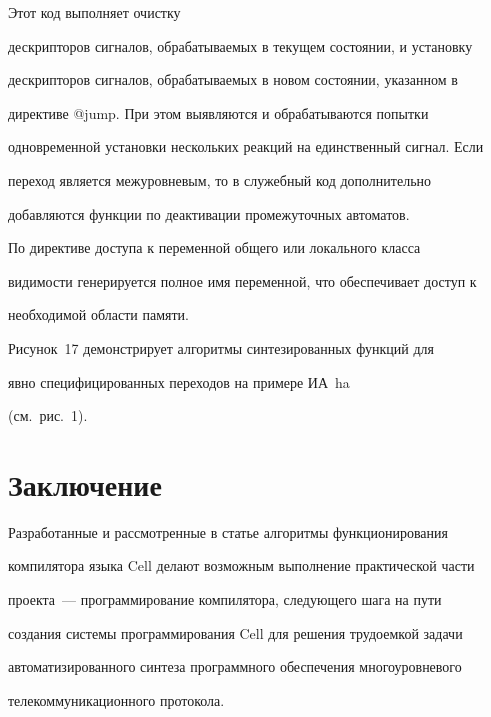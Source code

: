 Этот код выполняет очистку 


дескрипторов сигналов, обрабатываемых в текущем состоянии, и установку 


дескрипторов сигналов, обрабатываемых в новом состоянии, указанном в 


директиве @jump. При этом выявляются и обрабатываются попытки 


одновременной установки нескольких реакций на единственный сигнал. Если 


переход является межуровневым, то в служебный код дополнительно 


добавляются функции по деактивации промежуточных автоматов.


      


      По директиве доступа к переменной общего или локального класса 


видимости генерируется полное имя переменной, что обеспечивает доступ к 


необходимой области памяти.


      


      Рисунок~17 демонстрирует алгоритмы синтезированных функций для 


явно специфицированных переходов на примере ИА~ha 


(см.\ рис.~1).


      





     


\section{Заключение}


     


     Разработанные и рассмотренные в статье алгоритмы функционирования 


компилятора языка Cell делают возможным выполнение практической части 


проекта~--- программирование компилятора, следующего шага на пути 


создания системы программирования Cell для решения трудоемкой задачи 


автоматизированного синтеза программного обеспечения многоуровневого 


телекоммуникационного протокола.


